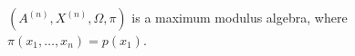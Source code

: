 
$(A^{(n)}, X^{(n)}, \Omega, \pi)$ is a maximum modulus algebra, where $\pi(x_1, \ldots, x_n) = p(x_1)$.
